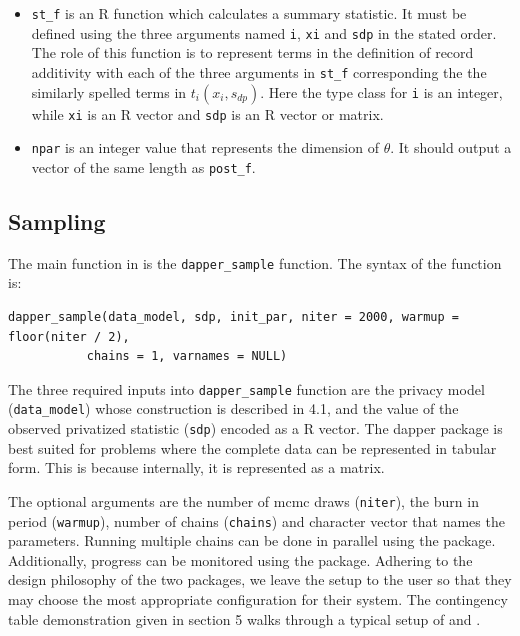 \begin{itemize}
\item
  \texttt{st\_f} is an R function which calculates a summary statistic. It
  must be defined using the three arguments named \texttt{i}, \texttt{xi} and \texttt{sdp}
  in the stated order. The role of this function is to represent terms in the definition of record additivity
  with each of the three arguments in \texttt{st\_f} corresponding the the similarly spelled
  terms in \(t_i(x_i, s_{dp})\). Here the type class for \texttt{i} is an integer,
  while \texttt{xi} is an R vector and \texttt{sdp} is an R vector or matrix.
\item
  \texttt{npar} is an integer value that represents the dimension of \(\theta\). It
  should output a vector of the same length as \texttt{post\_f}.
\end{itemize}

\hypertarget{sampling}{%
\subsection{Sampling}\label{sampling}}

The main function in  is the \texttt{dapper\_sample} function. The syntax of the function is:

\begin{verbatim}
dapper_sample(data_model, sdp, init_par, niter = 2000, warmup = floor(niter / 2),
           chains = 1, varnames = NULL)
\end{verbatim}

The three required inputs into \texttt{dapper\_sample} function are the privacy model (\texttt{data\_model})
whose construction is described in 4.1, and the value
of the observed privatized statistic (\texttt{sdp}) encoded as a R vector. The dapper
package is best suited for problems where the complete data can be represented in
tabular form. This is because internally, it is represented as a matrix.

The optional arguments are the number of mcmc draws (\texttt{niter}), the
burn in period (\texttt{warmup}), number of chains (\texttt{chains}) and character
vector that names the parameters. Running multiple chains can be done in parallel
using the  package. Additionally, progress can be monitored
using the  package. Adhering to the design philosophy
of the two packages, we leave the setup to the user so that they may
choose the most appropriate configuration for their system. The
contingency table demonstration given in section 5 walks
through a typical setup of  and .

